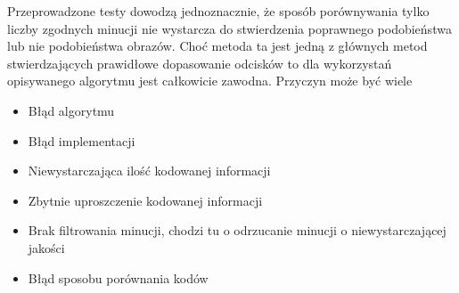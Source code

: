 Przeprowadzone testy dowodzą jednoznacznie, że sposób porównywania tylko liczby zgodnych minucji nie wystarcza do stwierdzenia poprawnego podobieństwa lub nie podobieństwa obrazów. Choć metoda ta jest jedną z głównych metod stwierdzających prawidłowe dopasowanie odcisków to dla wykorzystań opisywanego algorytmu jest całkowicie zawodna. Przyczyn może być wiele
\renewcommand*{\labelitemi}{\bullet}
\begin{itemize}
\item Błąd algorytmu
\item Błąd implementacji
\item Niewystarczająca ilość kodowanej informacji
\item Zbytnie uproszczenie kodowanej informacji
\item Brak filtrowania minucji, chodzi tu o odrzucanie minucji o niewystarczającej jakości
\item Błąd sposobu porównania kodów
\end{itemize}
